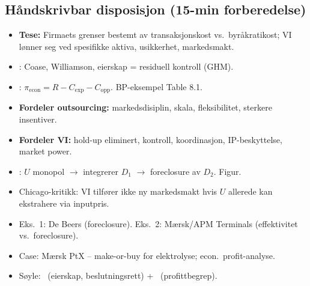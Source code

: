 \FloatBarrier
\subsection*{Håndskrivbar disposisjon (15-min forberedelse)}
\begin{itemize}\setlength{\itemsep}{2pt}
\item \textbf{Tese:} Firmaets grenser bestemt av transaksjonskost vs.\ byråkratikost; VI lønner seg ved spesifikke aktiva, usikkerhet, markedsmakt.
\item {}: Coase, Williamson, eierskap = residuell kontroll (GHM).
\item {}: $\pi_{\text{econ}} = R - C_{\text{exp}} - C_{\text{opp}}$. BP-eksempel Table 8.1.
\item \textbf{Fordeler outsourcing:} markedsdisiplin, skala, fleksibilitet, sterkere insentiver.
\item \textbf{Fordeler VI:} hold-up eliminert, kontroll, koordinasjon, IP-beskyttelse, market power.
\item {}: $U$ monopol $\to$ integrerer $D_1$ $\to$ foreclosure av $D_2$. Figur.
\item Chicago-kritikk: VI tilfører ikke ny markedsmakt hvis $U$ allerede kan ekstrahere via inputpris.
\item Eks.\ 1: De Beers (foreclosure). Eks.\ 2: Mærsk/APM Terminals (effektivitet vs.\ foreclosure).
\item Case: Mærsk PtX -- make-or-buy for elektrolyse; econ.\ profit-analyse.
\item Søyle: \SOne\ (eierskap, beslutningsrett) + \STwo\ (profittbegrep).
\end{itemize}
